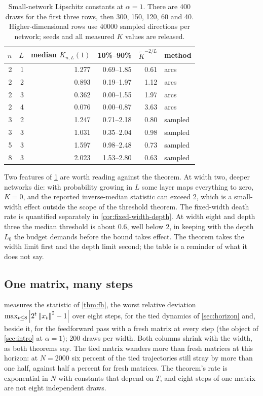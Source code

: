 \begin{table}[h]\centering
\begin{tabular}{rrrrrl}
\toprule
$n$ & $L$ & median $K_{n,L}(1)$ & 10\%--90\% & $\widetilde K^{-2/L}$ & method\\
\midrule
2 & 1 & 1.277 & 0.69--1.85 & 0.61 & arcs\\
2 & 2 & 0.893 & 0.19--1.97 & 1.12 & arcs\\
2 & 3 & 0.362 & 0.00--1.55 & 1.97 & arcs\\
2 & 4 & 0.076 & 0.00--0.87 & 3.63 & arcs\\
3 & 2 & 1.247 & 0.71--2.18 & 0.80 & sampled\\
3 & 3 & 1.031 & 0.35--2.04 & 0.98 & sampled\\
5 & 3 & 1.597 & 0.98--2.48 & 0.73 & sampled\\
8 & 3 & 2.023 & 1.53--2.80 & 0.63 & sampled\\
\bottomrule
\end{tabular}
\caption{Small-network Lipschitz constants at $\alpha=1$. There are 400 draws for the first three rows, then 300, 150, 120, 60 and 40. Higher-dimensional rows use 40000 sampled directions per network; seeds and all measured $K$ values are released.}
\label{tab:small}
\end{table}

Two features of \cref{tab:small} are worth reading against the theorem. At width two, deeper networks die: with probability growing in $L$ some layer maps everything to zero, $K=0$, and the reported inverse-median statistic can exceed $2$, which is a small-width effect outside the scope of the threshold theorem. The fixed-width death rate is quantified separately in \cref{cor:fixed-width-depth}. At width eight and depth three the median threshold is about $0.6$, well below $2$, in keeping with the depth $L_0$ the budget demands before the bound takes effect. The theorem takes the width limit first and the depth limit second; the table is a reminder of what it does not say.

\subsection{One matrix, many steps}

 measures the statistic of \cref{thm:fh}, the worst relative deviation $\max_{t\le8}\left\lvert 2^t\left\lVert x_t\right\rVert^2-1\right\rvert$ over eight steps, for the tied dynamics of \cref{sec:horizon} and, beside it, for the feedforward pass with a fresh matrix at every step (the object of \cref{sec:intro} at $\alpha=1$); 200 draws per width. Both columns shrink with the width, as both theorems say. The tied matrix wanders more than fresh matrices at this horizon: at $N=2000$ six percent of the tied trajectories still stray by more than one half, against half a percent for fresh matrices. The theorem's rate is exponential in $N$ with constants that depend on $T$, and eight steps of one matrix are not eight independent draws.

